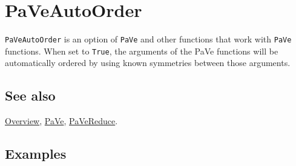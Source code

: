 \documentclass[../FeynCalcManual.tex]{subfiles}
\begin{document}
\hypertarget{paveautoorder}{
\section{PaVeAutoOrder}\label{paveautoorder}}

\texttt{PaVeAutoOrder} is an option of \texttt{PaVe} and other functions
that work with \texttt{PaVe} functions. When set to \texttt{True}, the
arguments of the PaVe functions will be automatically ordered by using
known symmetries between those arguments.

\subsection{See also}

\hyperlink{toc}{Overview}, \hyperlink{pave}{PaVe},
\hyperlink{pavereduce}{PaVeReduce}.

\subsection{Examples}
\end{document}

